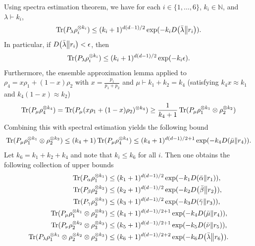 \documentclass[notitlepage]{article}
\begin{document}
Using spectra estimation theorem, we have for each $i \in \{1, \ldots, 6\}$, $k_i \in \mathbb N$, and $\lambda \vdash k_i$,
\begin{equation}
    \operatorname{Tr}(P_{\lambda} \rho_i^{\otimes k_i}) \leq (k_i + 1)^{d(d-1)/2} \exp(-k_i D\!\left(\bar \lambda\middle\|r_i\right)).
\end{equation}
In particular, if $D\!\left(\bar \lambda\middle\|r_i\right) < \epsilon$, then
\begin{equation}
    \operatorname{Tr}(P_{\lambda} \rho_i^{\otimes k_i}) \leq (k_i + 1)^{d(d-1)/2} \exp(-k_i \epsilon).
\end{equation}
Furthermore, the ensemble approximation lemma applied to $\rho_{4} = x \rho_1 + (1-x) \rho_2$ with $x = \frac{p_1}{p_1+p_2}$ and $\mu \vdash k_1 + k_2 = k_4$ (satisfying $k_4 x \approx k_1$ and $k_4 (1-x) \approx k_2$) 
\begin{equation}
    \operatorname{Tr}(P_{\mu} \rho_4^{\otimes k_4}) = \operatorname{Tr}(P_{\mu} (x \rho_1 + (1-x) \rho_2)^{\otimes k_4}) \geq \frac{1}{k_4 + 1}\operatorname{Tr}(P_{\mu} \rho_1^{\otimes k_1} \otimes \rho_2^{\otimes k_2})
\end{equation}
Combining this with spectral estimation yields the following bound
\begin{equation}
    \operatorname{Tr}(P_{\mu} \rho_1^{\otimes k_1} \otimes \rho_2^{\otimes k_2}) \leq (k_4 + 1) \operatorname{Tr}(P_{\mu} \rho_4^{\otimes k_4}) \leq (k_4+1)^{d(d-1)/2+1} \exp(-k_4 D\!\left(\bar \mu\middle\|r_4\right)).
\end{equation}
Let $k_6 = k_1 + k_2 + k_4$ and note that $k_i \leq k_6$ for all $i$.
Then one obtains the following collection of upper bounds
\begin{align}
    \operatorname{Tr}(P_{\alpha} \rho_1^{\otimes k_1}) &\leq (k_1 + 1)^{d(d-1)/2} \exp(-k_1 D\!\left(\bar \alpha\middle\|r_1\right)), \\
    \operatorname{Tr}(P_{\beta} \rho_2^{\otimes k_2}) &\leq (k_2 + 1)^{d(d-1)/2} \exp(-k_2 D\!\left(\bar \beta\middle\|r_2\right)), \\
    \operatorname{Tr}(P_{\gamma} \rho_3^{\otimes k_3}) &\leq (k_3 + 1)^{d(d-1)/2} \exp(-k_3 D\!\left(\bar \gamma\middle\|r_3\right)), \\
    \operatorname{Tr}(P_{\mu} \rho_1^{\otimes k_1} \otimes \rho_2^{\otimes k_2}) &\leq (k_4+1)^{d(d-1)/2+1} \exp(-k_4 D\!\left(\bar \mu\middle\|r_4\right)), \\
    \operatorname{Tr}(P_{\nu} \rho_2^{\otimes k_2} \otimes \rho_3^{\otimes k_3}) &\leq (k_5+1)^{d(d-1)/2+1} \exp(-k_5 D\!\left(\bar \nu\middle\|r_5\right)), \\
    \operatorname{Tr}(P_{\lambda} \rho_1^{\otimes k_1} \otimes \rho_2^{\otimes k_2} \otimes \rho_3^{\otimes k_3}) &\leq (k_6+1)^{d(d-1)/2+2} \exp(-k_6 D\!\left(\bar \lambda\middle\|r_6\right)).
\end{align}
\end{document}

